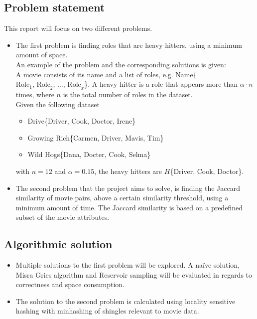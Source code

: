 \subsection{Problem statement}
	This report will focus on two different problems.
\begin{itemize}
	\item The first problem is finding roles that are heavy hitters, using a minimum amount of space. \\ %
	An example of the problem and the corresponding solutions is given: \\
	A movie consists of its name and a list of roles, e.g. Name\{\(\textrm{Role}_1 \textrm{, Role}_2 \textrm{, } \dots \textrm{, Role}_x\)\}. A heavy hitter is a role that appears more than \(\alpha \cdot n\) times, where \(n\) is the total number of roles in the dataset. \\
	Given the following dataset
	\begin{itemize}
		\item Drive\{Driver, Cook, Doctor, Irene\}
		\item Growing Rich\{Carmen, Driver, Mavis, Tim\}
		\item Wild Hogs\{Dana, Docter, Cook, Selma\}
	\end{itemize}
	with \(n=12\) and \(\alpha=0.15\), the heavy hitters are \(H\)\{Driver, Cook, Doctor\}.
	\item The second problem that the project aims to solve, is finding the Jaccard similarity of movie pairs, above a certain similarity threshold, using a minimum amount of time. The Jaccard similarity is based on a predefined subset of the movie attributes.
	
\end{itemize}

\subsection{Algorithmic solution}
\begin{itemize}
	\item Multiple solutions to the first problem will be explored. A naïve solution, Misra Gries algorithm and Reservoir sampling will be evaluated in regards to correctness and space consumption.
	\item The solution to the second problem is calculated using locality sensitive hashing with minhashing of shingles relevant to movie data.
\end{itemize}

